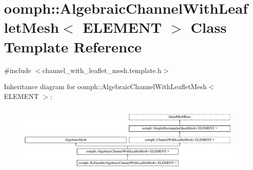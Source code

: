 \hypertarget{classoomph_1_1AlgebraicChannelWithLeafletMesh}{}\section{oomph\+:\+:Algebraic\+Channel\+With\+Leaflet\+Mesh$<$ E\+L\+E\+M\+E\+NT $>$ Class Template Reference}
\label{classoomph_1_1AlgebraicChannelWithLeafletMesh}


{\ttfamily \#include $<$channel\+\_\+with\+\_\+leaflet\+\_\+mesh.\+template.\+h$>$}

Inheritance diagram for oomph\+:\+:Algebraic\+Channel\+With\+Leaflet\+Mesh$<$ E\+L\+E\+M\+E\+NT $>$\+:\begin{figure}[H]
\begin{center}
\leavevmode
\includegraphics[height=3.500000cm]{classoomph_1_1AlgebraicChannelWithLeafletMesh}
\end{center}
\end{figure}
